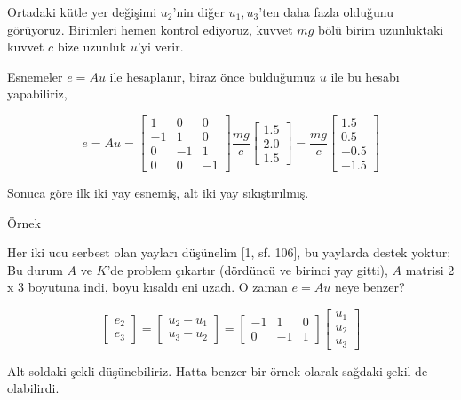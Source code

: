 \documentclass[12pt,fleqn]{article}\usepackage{../../common}
\begin{document}
Ortadaki kütle yer değişimi $u_2$'nin diğer $u_1,u_3$'ten daha fazla olduğunu
görüyoruz. Birimleri hemen kontrol ediyoruz, kuvvet $mg$ bölü birim uzunluktaki
kuvvet $c$ bize uzunluk $u$'yi verir.

Esnemeler $e = A u$ ile hesaplanır, biraz önce bulduğumuz $u$ ile bu hesabı
yapabiliriz,

$$
e = A u = 
\left[\begin{array}{rrr}
1 & 0 & 0 \\ -1 & 1 & 0 \\ 0 & -1 & 1 \\ 0 & 0 & -1
\end{array}\right]
\frac{mg}{c}
\left[\begin{array}{r}
1.5 \\ 2.0 \\ 1.5
\end{array}\right] =
\frac{mg}{c}
\left[\begin{array}{r}
1.5 \\ 0.5 \\ -0.5 \\ -1.5
\end{array}\right]
$$

Sonuca göre ilk iki yay esnemiş, alt iki yay sıkıştırılmış.

Örnek

Her iki ucu serbest olan yayları düşünelim [1, sf. 106], bu yaylarda destek
yoktur; Bu durum $A$ ve $K$'de problem çıkartır (dördüncü ve birinci yay gitti),
$A$ matrisi 2 x 3 boyutuna indi, boyu kısaldı eni uzadı. O zaman $e = Au$ neye
benzer?

$$
\left[\begin{array}{r}
e_2 \\ e_3 
\end{array}\right] =
\left[\begin{array}{r}
u_2 - u_1 \\u_3 - u_2
\end{array}\right] =
\left[\begin{array}{rrr}
-1 & 1 & 0 \\ 0 & -1 & 1
\end{array}\right]
\left[\begin{array}{r}
u_1 \\ u_2 \\ u_3
\end{array}\right] 
$$

Alt soldaki şekli düşünebiliriz. Hatta benzer bir örnek olarak sağdaki şekil de
olabilirdi. 
\end{document}
